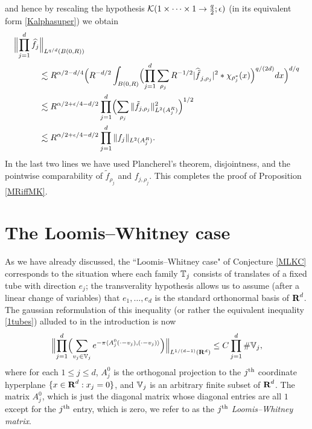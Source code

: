 and hence by rescaling the hypothesis ${\mathcal{K}}(1\times\cdots\times 1\rightarrow
\tfrac{q}{2};\epsilon)$ (in its equivalent form \eqref{Kalphasuper}) we
obtain
\begin{eqnarray*}
\begin{aligned}
\Bigl\|\prod_{j=1}^{d}\widehat{f}_{j}&\Bigl\|_{L^{q/d}(B(0,R))}\\
&\lesssim
R^{\alpha/2-d/4}\Bigl(
R^{-d/2}\int_{B(0,R)}\Bigl(\prod_{j=1}^{d}
\sum_{\rho_{j}}R^{-1/2}|\widehat{\tilde{f}}_{j,\rho_{j}}|^{2}*\chi_{\rho_{j}^*}(x)
\Bigr)^{q/(2d)}dx\Bigr)^{d/q}\\
&\lesssim R^{\alpha/2+\epsilon/4-d/2}\prod_{j=1}^{d}
\Bigl(\sum_{\rho_{j}}\|\tilde{f}_{j,\rho_{j}}\|_{L^2(A^R_j)}^{2}\Bigr)^{1/2}\\
&\lesssim R^{\alpha/2+\epsilon/4-d/2}\prod_{j=1}^{d}\|f_{j}\|_{L^2(A^R_j)}.
\end{aligned}
\end{eqnarray*}
In the last two lines we have used Plancherel's theorem,
disjointness, and the pointwise comparability of
$\tilde{f}_{\rho_j}$ and $f_{j,\rho_j}$. This completes the proof of
Proposition \ref{MRiffMK}.

\section{The Loomis--Whitney case}

As we have already discussed, the ``Loomis--Whitney case" of
Conjecture \ref{MLKC} corresponds to the situation where each
family ${\mathbb{T}}_j$ consists of translates of a fixed tube with
direction $e_j$; the transverality hypothesis allows us to assume (after a linear
change of variables) that
$e_1,\ldots,e_d$ is the standard orthonormal basis of ${\hbox{\bf R}}^d$. The gaussian reformulation of this inequality (or
rather the equivalent inequality \eqref{1tubes}) alluded to in the
introduction is now
\begin{equation}\label{lwreformulation}
\Bigl\|\prod_{j=1}^{d}\Bigl(\sum_{v_{j}\in{\mathbb{V}}_{j}}e^{-\pi\langle
A_{j}^{0}(\cdot-v_{j}),(\cdot-v_{j})\rangle}\Bigr)\Bigr\|_{L^{1/(d-1)}({\bf
R}^{d})} \leq C\prod_{j=1}^{d}\mbox{\#}{\mathbb{V}}_{j},
\end{equation}
where for each $1\leq j\leq d$, $A_j^0$ is the orthogonal
projection to the $j^{{\operatorname{th}}}$ coordinate hyperplane $\{x\in{\hbox{\bf R}}^d:x_j =
0\}$, and ${\mathbb{V}}_j$ is an arbitrary finite subset of ${\hbox{\bf R}}^d$. The
matrix $A_j^0$, which is just the diagonal matrix whose diagonal
entries are all $1$ except for the $j^{{\operatorname{th}}}$ entry, which is zero, we
refer to as the \textit{$j^{{\operatorname{th}}}$ Loomis--Whitney matrix}.

